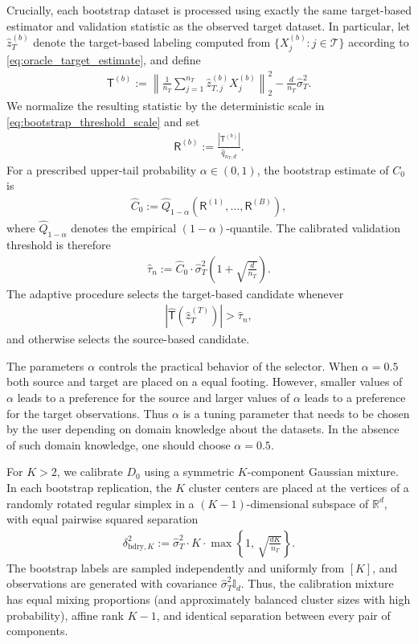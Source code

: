 \documentclass[10pt]{article}
\newcommand{\R}{\mathbb R}
\newcommand{\Id}{\mathbb I}
\newcommand{\wh}{\widehat}
\newcommand{\calT}{\mathcal T}
\newcommand{\trg}{T}
\newcommand{\nT}{n_{\trg}}
\newcommand{\hatztar}{\wh{z}^{(\trg)}}
\newcommand{\rmT}{\mathsf{T}}
\begin{document}
Crucially, each bootstrap dataset is processed using exactly the same
target-based estimator and validation statistic as the observed target
dataset. In particular, let $\wh z^{(b)}_{\trg}$
denote the target-based labeling computed from 
$\{X_j^{(b)}:j\in\calT\}$ according to \eqref{eq:oracle_target_estimate}, and define
\begin{align}
\label{eq:bootstrap_statistic}
\mathsf T^{(b)}:=\left\|\frac{1}{\nT}\sum_{j=1}^{\nT}\hat z^{(b)}_{\trg,j}X_j^{(b)}\right\|_2^2-\frac{d}{\nT}\wh\sigma^2_T.
\end{align}
We normalize the resulting statistic by the deterministic scale in
\eqref{eq:bootstrap_threshold_scale} and set
\begin{align}
\label{eq:bootstrap_normalized_statistic}
\mathsf R^{(b)}:=\frac{|\mathsf T^{(b)}|}{\wh q_{\nT,d}}.
\end{align}
For a prescribed upper-tail probability $\alpha\in(0,1)$, the bootstrap
estimate of $C_0$ is
\begin{align}
\label{eq:bootstrap_C0}
\wh C_0:= \wh Q_{1-\alpha}\left(\mathsf R^{(1)},\ldots,\mathsf R^{(B)}\right),
\end{align}
where $\wh Q_{1-\alpha}$ denotes the empirical
$(1-\alpha)$-quantile. The calibrated validation threshold is therefore
\begin{align}
\label{eq:bootstrap_calibrated_threshold}
\wh\tau_n:=\wh C_0\cdot\wh\sigma^2_T\left(1+\sqrt{\frac{d}{\nT}}\right).
\end{align}
The adaptive procedure selects the target-based candidate whenever
\begin{align}
\left|\wh{\rmT}(\hatztar_{\trg})\right|>\widehat\tau_n,
\end{align}
and otherwise selects the source-based candidate. 

The parameters $\alpha$ controls the practical behavior of the selector. When $\alpha=0.5$ both source and target are placed on a equal footing. However, smaller values of $\alpha$ leads to a preference for the source and larger values of $\alpha$ leads to a preference for the target observations. Thus $\alpha$ is a tuning parameter that needs to be chosen by the user depending on domain knowledge about the datasets. In the absence of such domain knowledge, one should choose $\alpha=0.5$. 

For $K>2$, we calibrate $D_0$ using a symmetric $K$-component Gaussian mixture. In each bootstrap replication, the $K$ cluster centers are placed at the vertices of a randomly rotated regular simplex in a $(K-1)$-dimensional subspace of $\R^d$, with equal pairwise squared separation
\begin{align}
\delta_{\mathrm{bdry},K}^2:=\wh\sigma_T^2 \cdot K \cdot\max\left\{1,\,\sqrt{\frac{dK}{\nT}}\right\}.
\end{align}
The bootstrap labels are sampled independently and uniformly from $[K]$, and observations are generated with covariance $\wh\sigma_T^2\Id_d$. Thus, the calibration mixture has equal mixing proportions (and approximately balanced cluster sizes with high probability), affine rank $K-1$, and identical separation between every pair of components.
\end{document}
